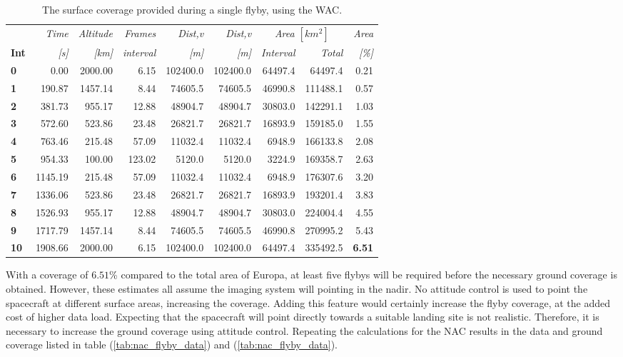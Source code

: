\begin{table}[h!]
  \centering
    \begin{tabular}{l|r|r|r|r|r|r|r|r|}
      & \textit{Time} & \textit{Altitude} & \textit{Frames} & \textit{Dist,v} & \textit{Dist,v} & \multicolumn{2}{c|}{\textit{Area $[km^2]$}} & \multicolumn{1}{r}{\textit{Area}} \\
\textbf{Int} & \textit{[s]} & \textit{[km]} & \textit{interval} & \textit{[m]} & \textit{[m]} & \textit{Interval} & \textit{Total} & \multicolumn{1}{r}{\textit{[\%]}} \bigstrut[b]\\
\hline
\textbf{0} & 0.00  & 2000.00 & 6.15  & 102400.0 & 102400.0 & 64497.4 & 64497.4 & 0.21 \bigstrut[t]\\
\textbf{1} & 190.87 & 1457.14 & 8.44  & 74605.5 & 74605.5 & 46990.8 & 111488.1 & 0.57 \\
\textbf{2} & 381.73 & 955.17 & 12.88 & 48904.7 & 48904.7 & 30803.0 & 142291.1 & 1.03 \\
\textbf{3} & 572.60 & 523.86 & 23.48 & 26821.7 & 26821.7 & 16893.9 & 159185.0 & 1.55 \\
\textbf{4} & 763.46 & 215.48 & 57.09 & 11032.4 & 11032.4 & 6948.9 & 166133.8 & 2.08 \\
\textbf{5} & 954.33 & 100.00 & 123.02 & 5120.0 & 5120.0 & 3224.9 & 169358.7 & 2.63 \\
\textbf{6} & 1145.19 & 215.48 & 57.09 & 11032.4 & 11032.4 & 6948.9 & 176307.6 & 3.20 \\
\textbf{7} & 1336.06 & 523.86 & 23.48 & 26821.7 & 26821.7 & 16893.9 & 193201.4 & 3.83 \\
\textbf{8} & 1526.93 & 955.17 & 12.88 & 48904.7 & 48904.7 & 30803.0 & 224004.4 & 4.55 \\
\textbf{9} & 1717.79 & 1457.14 & 8.44  & 74605.5 & 74605.5 & 46990.8 & 270995.2 & 5.43 \\
\textbf{10} & 1908.66 & 2000.00 & 6.15  & 102400.0 & 102400.0 & 64497.4 & 335492.5 & \textbf{6.51} \\
\end{tabular}%
  \caption{The surface coverage provided during a single flyby, using the WAC.}
  \label{tab:wac_flyby_coverage}%
\end{table}%
With a coverage of $6.51$\% compared to the total area of Europa, at least five flybys will be required before the necessary ground coverage is obtained. However, these estimates all assume the imaging system will pointing in the nadir. No attitude control is used to point the spacecraft at different surface areas, increasing the coverage. Adding this feature would certainly increase the flyby coverage, at the added cost of higher data load. Expecting that the spacecraft will point directly towards a suitable landing site is not realistic. Therefore, it is necessary to increase the ground coverage using attitude control. Repeating the calculations for the NAC results in the data and ground coverage listed in table (\ref{tab:nac_flyby_data}) and (\ref{tab:nac_flyby_data}).
